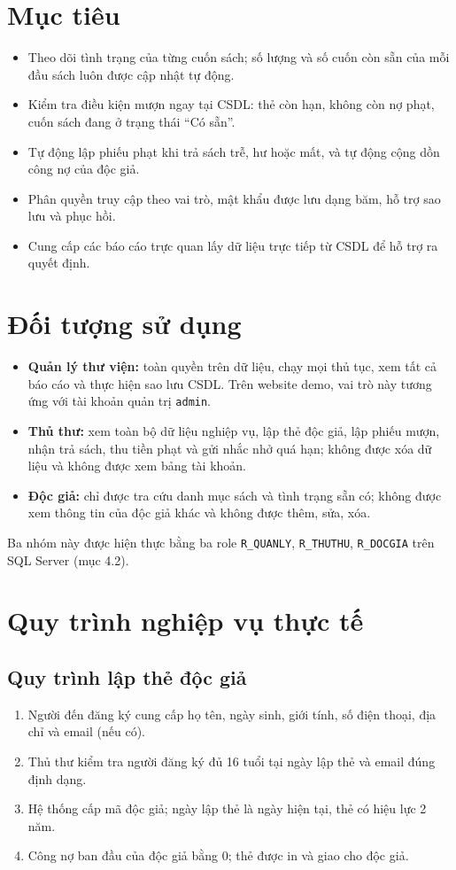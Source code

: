 \documentclass[13pt,a4paper,oneside]{extreport}
\begin{document}
\section{Mục tiêu}
\begin{itemize}
\item Theo dõi tình trạng của từng cuốn sách; số lượng và số cuốn còn sẵn của mỗi đầu sách luôn được cập nhật tự động.
\item Kiểm tra điều kiện mượn ngay tại CSDL: thẻ còn hạn, không còn nợ phạt, cuốn sách đang ở trạng thái ``Có sẵn''.
\item Tự động lập phiếu phạt khi trả sách trễ, hư hoặc mất, và tự động cộng dồn công nợ của độc giả.
\item Phân quyền truy cập theo vai trò, mật khẩu được lưu dạng băm, hỗ trợ sao lưu và phục hồi.
\item Cung cấp các báo cáo trực quan lấy dữ liệu trực tiếp từ CSDL để hỗ trợ ra quyết định.
\end{itemize}

\section{Đối tượng sử dụng}
\begin{itemize}
\item \textbf{Quản lý thư viện:} toàn quyền trên dữ liệu, chạy mọi thủ tục, xem tất cả báo cáo và thực hiện sao lưu CSDL. Trên website demo, vai trò này tương ứng với tài khoản quản trị \texttt{admin}.
\item \textbf{Thủ thư:} xem toàn bộ dữ liệu nghiệp vụ, lập thẻ độc giả, lập phiếu mượn, nhận trả sách, thu tiền phạt và gửi nhắc nhở quá hạn; không được xóa dữ liệu và không được xem bảng tài khoản.
\item \textbf{Độc giả:} chỉ được tra cứu danh mục sách và tình trạng sẵn có; không được xem thông tin của độc giả khác và không được thêm, sửa, xóa.
\end{itemize}
Ba nhóm này được hiện thực bằng ba role \texttt{R\_QUANLY}, \texttt{R\_THUTHU}, \texttt{R\_DOCGIA} trên SQL Server (mục 4.2).

\section{Quy trình nghiệp vụ thực tế}
\subsection{Quy trình lập thẻ độc giả}
\begin{enumerate}
\item Người đến đăng ký cung cấp họ tên, ngày sinh, giới tính, số điện thoại, địa chỉ và email (nếu có).
\item Thủ thư kiểm tra người đăng ký đủ 16 tuổi tại ngày lập thẻ và email đúng định dạng.
\item Hệ thống cấp mã độc giả; ngày lập thẻ là ngày hiện tại, thẻ có hiệu lực 2 năm.
\item Công nợ ban đầu của độc giả bằng 0; thẻ được in và giao cho độc giả.
\end{enumerate}
\end{document}

